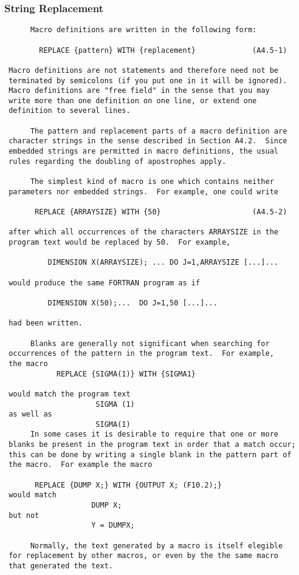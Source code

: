  \subsubsection{String Replacement}
 \begin{verbatim}
      Macro definitions are written in the following form:

        REPLACE {pattern} WITH {replacement}             (A4.5-1)

 Macro definitions are not statements and therefore need not be
 terminated by semicolons (if you put one in it will be ignored).
 Macro definitions are "free field" in the sense that you may
 write more than one definition on one line, or extend one
 definition to several lines.

      The pattern and replacement parts of a macro definition are
 character strings in the sense described in Section A4.2.  Since
 embedded strings are permitted in macro definitions, the usual
 rules regarding the doubling of apostrophes apply.

      The simplest kind of macro is one which contains neither
 parameters nor embedded strings.  For example, one could write

       REPLACE {ARRAYSIZE} WITH {50}                     (A4.5-2)

 after which all occurrences of the characters ARRAYSIZE in the
 program text would be replaced by 50.  For example,

          DIMENSION X(ARRAYSIZE); ... DO J=1,ARRAYSIZE [...]...

 would produce the same FORTRAN program as if

          DIMENSION X(50);...  DO J=1,50 [...]...

 had been written.

      Blanks are generally not significant when searching for
 occurrences of the pattern in the program text.  For example,
 the macro
            REPLACE {SIGMA(1)} WITH {SIGMA1}

 would match the program text
                     SIGMA (1)
 as well as
                     SIGMA(1)
      In some cases it is desirable to require that one or more
 blanks be present in the program text in order that a match occur;
 this can be done by writing a single blank in the pattern part of
 the macro.  For example the macro

       REPLACE {DUMP X;} WITH {OUTPUT X; (F10.2);}
 would match
                    DUMP X;
 but not
                    Y = DUMPX;

      Normally, the text generated by a macro is itself elegible
 for replacement by other macros, or even by the the same macro
 that generated the text.

 \end{verbatim}
